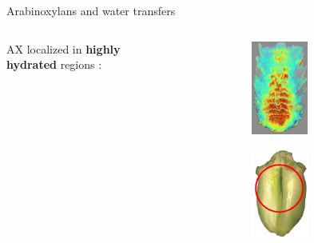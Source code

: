 \documentclass[10pt]{beamer}
\begin{document}
\begin{frame}{Arabinoxylans and water transfers}
  \begin{columns}[totalwidth=\textwidth]
    \begin{column}[t]{0.5\linewidth}
        {AX localized in \textbf{highly hydrated} regions \cite{Fanuel18}:}
    \end{column}
    \begin{column}[c]{0.5\linewidth}
      \hfill
      \begin{figure}[ht]
        \centering
        \begin{subfigure}[t]{0.45\textwidth}
          \centering
          \includegraphics[width=0.6\textwidth]{fig/3DAX}
          \label{subfig:3Darabinoxylan}
        \end{subfigure}%
        \begin{subfigure}[t]{0.45\textwidth}
          \centering
          \includegraphics[width=0.6\textwidth]{fig/water_transfer}

\end{subfigure}
\end{figure}
\end{column}
\end{columns}
\end{frame}
\end{document}
